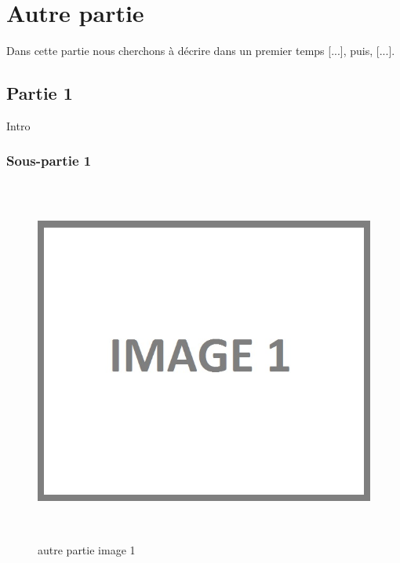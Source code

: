 \chapter{Autre partie}

Dans cette partie nous cherchons à décrire dans un premier temps [...], puis, [...].

\section{Partie 1}

Intro

\subsection{Sous-partie 1}

\begin{figure}[!ht]
\begin{center}
\includegraphics[height=12cm]{autre_partie/image1}
\end{center}
\caption[autre partie générale]{autre partie image 1\protect\footnotemark}
\end{figure}


